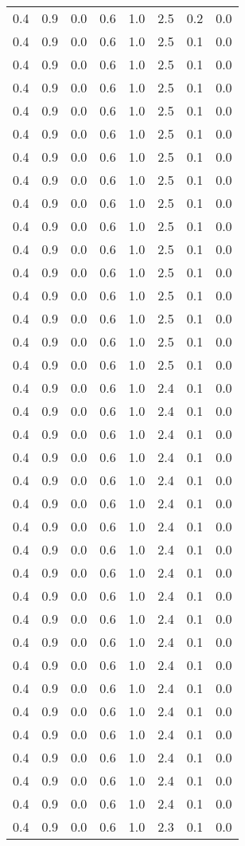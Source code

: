 \begin{tabular}{L{1in}|L{1in}|L{1in}|L{1in}|L{1in}|L{1in}|L{1in}|L{1in}}
0.4&0.9&0.0&0.6&1.0&2.5&0.2&0.0\\
0.4&0.9&0.0&0.6&1.0&2.5&0.1&0.0\\
0.4&0.9&0.0&0.6&1.0&2.5&0.1&0.0\\
0.4&0.9&0.0&0.6&1.0&2.5&0.1&0.0\\
0.4&0.9&0.0&0.6&1.0&2.5&0.1&0.0\\
0.4&0.9&0.0&0.6&1.0&2.5&0.1&0.0\\
0.4&0.9&0.0&0.6&1.0&2.5&0.1&0.0\\
0.4&0.9&0.0&0.6&1.0&2.5&0.1&0.0\\
0.4&0.9&0.0&0.6&1.0&2.5&0.1&0.0\\
0.4&0.9&0.0&0.6&1.0&2.5&0.1&0.0\\
0.4&0.9&0.0&0.6&1.0&2.5&0.1&0.0\\
0.4&0.9&0.0&0.6&1.0&2.5&0.1&0.0\\
0.4&0.9&0.0&0.6&1.0&2.5&0.1&0.0\\
0.4&0.9&0.0&0.6&1.0&2.5&0.1&0.0\\
0.4&0.9&0.0&0.6&1.0&2.5&0.1&0.0\\
0.4&0.9&0.0&0.6&1.0&2.5&0.1&0.0\\
0.4&0.9&0.0&0.6&1.0&2.4&0.1&0.0\\
0.4&0.9&0.0&0.6&1.0&2.4&0.1&0.0\\
0.4&0.9&0.0&0.6&1.0&2.4&0.1&0.0\\
0.4&0.9&0.0&0.6&1.0&2.4&0.1&0.0\\
0.4&0.9&0.0&0.6&1.0&2.4&0.1&0.0\\
0.4&0.9&0.0&0.6&1.0&2.4&0.1&0.0\\
0.4&0.9&0.0&0.6&1.0&2.4&0.1&0.0\\
0.4&0.9&0.0&0.6&1.0&2.4&0.1&0.0\\
0.4&0.9&0.0&0.6&1.0&2.4&0.1&0.0\\
0.4&0.9&0.0&0.6&1.0&2.4&0.1&0.0\\
0.4&0.9&0.0&0.6&1.0&2.4&0.1&0.0\\
0.4&0.9&0.0&0.6&1.0&2.4&0.1&0.0\\
0.4&0.9&0.0&0.6&1.0&2.4&0.1&0.0\\
0.4&0.9&0.0&0.6&1.0&2.4&0.1&0.0\\
0.4&0.9&0.0&0.6&1.0&2.4&0.1&0.0\\
0.4&0.9&0.0&0.6&1.0&2.4&0.1&0.0\\
0.4&0.9&0.0&0.6&1.0&2.4&0.1&0.0\\
0.4&0.9&0.0&0.6&1.0&2.4&0.1&0.0\\
0.4&0.9&0.0&0.6&1.0&2.4&0.1&0.0\\
0.4&0.9&0.0&0.6&1.0&2.3&0.1&0.0\\

\end{tabular}
